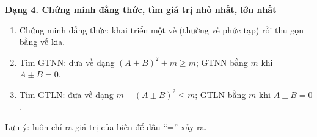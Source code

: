 \textbf{Dạng 4. Chứng minh đẳng thức, tìm giá trị nhỏ nhất, lớn nhất}
\begin{enumerate}
\item Chứng minh đẳng thức: khai triển một vế (thường vế phức tạp) rồi thu gọn bằng vế kia.
\item Tìm GTNN: đưa về dạng $(A\pm B)^2+m\ge m$; GTNN bằng $m$ khi $A\pm B=0$.
\item Tìm GTLN: đưa về dạng $m-(A\pm B)^2\le m$; GTLN bằng $m$ khi $A\pm B=0$.
\end{enumerate}
Lưu ý: luôn chỉ ra giá trị của biến để dấu ``='' xảy ra.
